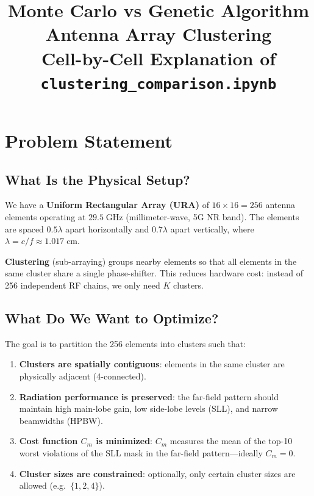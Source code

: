 \documentclass[11pt,a4paper]{article}
\title{Monte Carlo vs Genetic Algorithm\\Antenna Array Clustering\\[6pt]
\large Cell-by-Cell Explanation of \texttt{clustering\_comparison.ipynb}}
\author{}
\date{}
\begin{document}
\maketitle
\tableofcontents
\newpage

\section{Problem Statement}

\subsection{What Is the Physical Setup?}

We have a \textbf{Uniform Rectangular Array (URA)} of $16 \times 16 = 256$ antenna elements
operating at $29.5\;\text{GHz}$ (millimeter-wave, 5G NR band).
The elements are spaced $0.5\lambda$ apart horizontally and $0.7\lambda$ apart vertically,
where $\lambda = c / f \approx 1.017\;\text{cm}$.

\textbf{Clustering} (sub-arraying) groups nearby elements so that all elements
in the same cluster share a single phase-shifter.
This reduces hardware cost: instead of 256 independent RF chains, we only need
$K$ clusters.

\subsection{What Do We Want to Optimize?}

The goal is to partition the 256 elements into clusters such that:
\begin{enumerate}[label=(\roman*)]
    \item \textbf{Clusters are spatially contiguous}: elements in the same cluster
          are physically adjacent (4-connected).
    \item \textbf{Radiation performance is preserved}: the far-field pattern should maintain
          high main-lobe gain, low side-lobe levels (SLL), and narrow beamwidths (HPBW).
    \item \textbf{Cost function $C_m$ is minimized}: $C_m$ measures the mean of the top-10
          worst violations of the SLL mask in the far-field pattern---ideally $C_m = 0$.
    \item \textbf{Cluster sizes are constrained}: optionally, only certain cluster sizes
          are allowed (e.g.\ $\{1, 2, 4\}$).
\end{enumerate}
\end{document}
